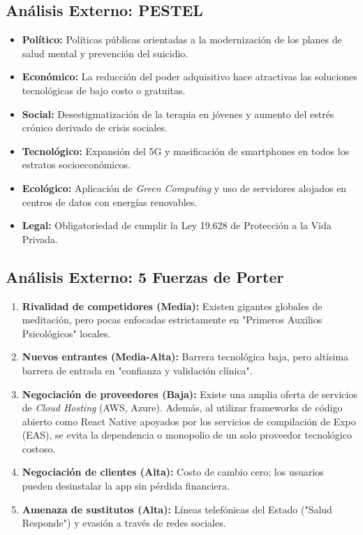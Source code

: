 \documentclass[12pt,letterpaper]{article}
\begin{document}
\subsection{Análisis Externo: PESTEL}
\begin{itemize}[leftmargin=*]
    \item \textbf{Político:} Políticas públicas orientadas a la modernización de los planes de salud mental y prevención del suicidio.
    \item \textbf{Económico:} La reducción del poder adquisitivo hace atractivas las soluciones tecnológicas de bajo costo o gratuitas.
    \item \textbf{Social:} Desestigmatización de la terapia en jóvenes y aumento del estrés crónico derivado de crisis sociales.
    \item \textbf{Tecnológico:} Expansión del 5G y masificación de smartphones en todos los estratos socioeconómicos.
    \item \textbf{Ecológico:} Aplicación de \textit{Green Computing} y uso de servidores alojados en centros de datos con energías renovables.
    \item \textbf{Legal:} Obligatoriedad de cumplir la Ley 19.628 de Protección a la Vida Privada.
\end{itemize}

\subsection{Análisis Externo: 5 Fuerzas de Porter}
\begin{enumerate}[leftmargin=*]
\item \textbf{Rivalidad de competidores (Media):} Existen gigantes globales de meditación, pero pocas enfocadas estrictamente en "Primeros Auxilios Psicológicos" locales.
\item \textbf{Nuevos entrantes (Media-Alta):} Barrera tecnológica baja, pero altísima barrera de entrada en "confianza y validación clínica".
\item \textbf{Negociación de proveedores (Baja):} Existe una amplia oferta de servicios de \textit{Cloud Hosting} (AWS, Azure). Además, al utilizar frameworks de código abierto como React Native apoyados por los servicios de compilación de Expo (EAS), se evita la dependencia o monopolio de un solo proveedor tecnológico costoso.
\item \textbf{Negociación de clientes (Alta):} Costo de cambio cero; los usuarios pueden desinstalar la app sin pérdida financiera.
\item \textbf{Amenaza de sustitutos (Alta):} Líneas telefónicas del Estado ("Salud Responde") y evasión a través de redes sociales.
\end{enumerate}
\end{document}
